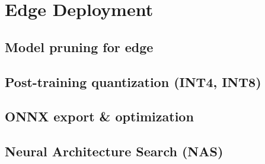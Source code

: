 
\section{Edge Deployment}

\subsection{Model pruning for edge}


\subsection{Post-training quantization (INT4, INT8)}


\subsection{ONNX export \& optimization}


\subsection{Neural Architecture Search (NAS)}


